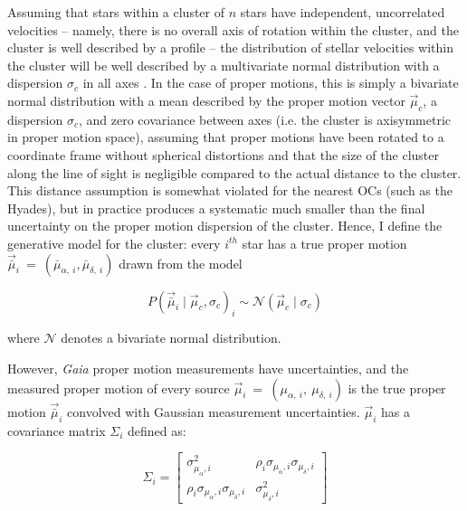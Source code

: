 Assuming that stars within a cluster of $n$ stars have independent, uncorrelated velocities -- namely, there is no overall axis of rotation within the cluster, and the cluster is well described by a \cite{king_structure_1966} profile -- the distribution of stellar velocities within the cluster will be well described by a multivariate normal distribution with a dispersion $\sigma_c$ in all axes \citep{king_structure_1966}. In the case of proper motions, this is simply a bivariate normal distribution with a mean described by the proper motion vector $\vec{\mu}_c$, a dispersion $\sigma_c$, and zero covariance between axes (i.e. the cluster is axisymmetric in proper motion space), assuming that proper motions have been rotated to a coordinate frame without spherical distortions and that the size of the cluster along the line of sight is negligible compared to the actual distance to the cluster. This distance assumption is somewhat violated for the nearest OCs (such as the Hyades), but in practice produces a systematic much smaller than the final uncertainty on the proper motion dispersion of the cluster. Hence, I define the generative model for the cluster: every $i^{th}$ star has a true proper motion $\vec{\bar{\mu}}_i~=~(\bar{\mu}_{\alpha,~i},\bar{\mu}_{\delta,~i})$ drawn from the model

\begin{equation}\label{eqn:dynamics:velocities:generative_model}
    P(\vec{\bar{\mu}}_i \mid
    \vec{\mu}_c, \sigma_c)_i \sim \mathcal{N}(\vec{\mu}_c \mid \sigma_c)
\end{equation}

\noindent
where $\mathcal{N}$ denotes a bivariate normal distribution.

However, \emph{Gaia} proper motion measurements have uncertainties, and the measured proper motion of every source $\vec{\mu}_i~=~(\mu_{\alpha,~i},~\mu_{\delta,~i})$ is the true proper motion $\vec{\bar{\mu}}_i$ convolved with Gaussian measurement uncertainties. $\vec{\mu}_i$ has a covariance matrix $\Sigma_i$ defined as:

\begin{equation}
    \Sigma_i = 
        \begin{bmatrix}
        \sigma_{\mu_\alpha, i}^2 
        & \rho_i \sigma_{\mu_\alpha, i} \sigma_{\mu_\delta, i}\\
        \rho_i \sigma_{\mu_\alpha, i} \sigma_{\mu_\delta, i}
        & \sigma_{\mu_\delta, i}^2
        \end{bmatrix}
\end{equation}

